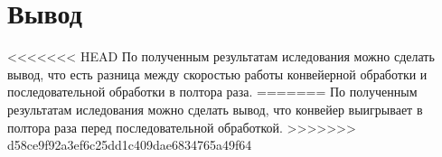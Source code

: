 \begin{center}
	\label{img:graph_sorted}
\end{center}





\section{Вывод}
<<<<<<< HEAD
По полученным результатам иследования можно сделать вывод, что есть разница между скоростью работы конвейерной обработки и последовательной обработки в полтора раза.
=======
По полученным результатам иследования можно сделать вывод, что конвейер выигрывает в полтора раза перед последовательной обработкой.
>>>>>>> d58ce9f92a3ef6c25dd1c409dae6834765a49f64

